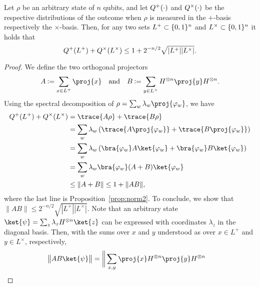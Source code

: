 \begin{theorem} \label{thm:hadamard}
  Let $\rho$ be an arbitrary state of $n$ qubits, and let $Q^{+}(\cdot)$ and
  $Q^{\times}(\cdot)$ be the respective distributions of the outcome when
  $\rho$ is measured in the $+$-basis respectively the $\times$-basis.
  Then, for any two sets $L^+ \subset \{0,1\}^n$ and $L^{\times}
  \subset \{0,1\}^n$ it holds that
\[ Q^{+}(L^+)+Q^{\times}(L^{\times}) \leq 1 + 2^{-n/2} \sqrt{|L^+|
   |L^{\times}|}. \]
\end{theorem}
\begin{proof}
We define the two orthogonal projectors
\[
A \assign \sum_{x \in L^+} \proj{x} \quad \mbox{and} \quad B \assign \sum_{y \in
  L^{\times}} H^{\otimes n}\proj{y}H^{\otimes n}.
\]
Using the spectral decomposition of $\rho = \sum_w \lambda_w
\proj{\varphi_w}$, we have
\begin{align*}
\Qp(L^+)+\Qt(L^{\times}) &= \trace{A\rho}  + \trace{B\rho}\\
 &= \sum_w
\lambda_w \left( \trace{A \proj{\varphi_w}} + \trace{B
    \proj{\varphi_w}} \right)\\
&= \sum_w \lambda_w \left( \bra{\varphi_w}A\ket{\varphi_w} +
  \bra{\varphi_w}B\ket{\varphi_w} \right)\\
&= \sum_w \lambda_w \bra{\varphi_w}(A+B)\ket{\varphi_w}\\
&\leq \|A+B\| \leq 1 + \|AB\|,
\end{align*}
where the last line is Proposition~\ref{prop:norm2}.
To conclude, we show that $\|AB\| \leq 2^{-n/2} \sqrt{|L^+|
  |L^{\times}|}$. Note that an arbitrary state $\ket{\psi} = \sum_z
\lambda_z H^{\otimes n} \ket{z}$ can be expressed with coordinates
$\lambda_z$ in the diagonal basis. Then, with the sums over $x$ and $y$ understood as over $x \in L^+$ and $y \in L^{\times}$, respectively, 
\begin{align*}
\big\| AB &\ket{\psi} \big\| = \bigg\| \sum_{x,y} \proj{x} H^{\otimes
  n}\proj{y}H^{\otimes n}  

\end{align*}
\end{proof}
